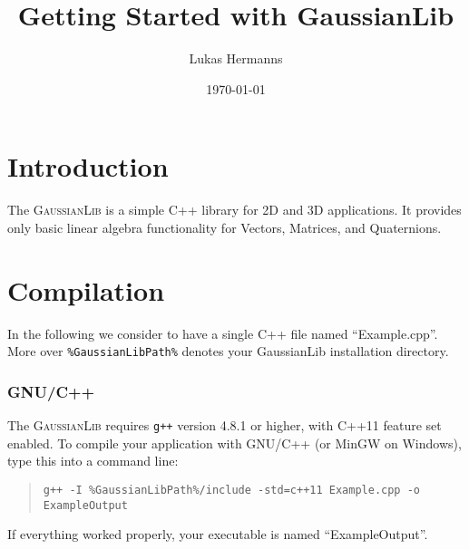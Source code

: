 \documentclass{article}
\title{Getting Started with GaussianLib}
\author{Lukas Hermanns}
\date{\today}
\begin{document}

\def\gausslib{\textsc{GaussianLib}\xspace}


\maketitle



\section*{Introduction}

The \gausslib is a simple C++ library for 2D and 3D applications.
It provides only basic linear algebra functionality for Vectors, Matrices, and Quaternions.



\section*{Compilation}

In the following we consider to have a single C++ file named ``Example.cpp''.
More over \texttt{\%GaussianLibPath\%} denotes your GaussianLib installation directory.

\subsubsection*{GNU/C++}

The \gausslib requires \texttt{g++} version 4.8.1 or higher, with C++11 feature set enabled.
To compile your application with GNU/C++ (or MinGW on Windows), type this into a command line:
\begin{quote}
\texttt{g++ -I \%GaussianLibPath\%/include -std=c++11 Example.cpp -o ExampleOutput}
\end{quote}
If everything worked properly, your executable is named ``ExampleOutput''.
\end{document}
